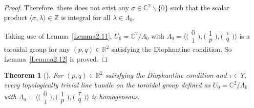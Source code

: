 \documentclass[10pt,a4paper]{amsart}
\numberwithin{equation}{section}
\newtheorem{Theorem}{Theorem}[section]
\begin{document}
\begin{proof}
Therefore, there does not exist any $\sigma \in \mathbb{C}^2 \backslash \{ 0 \}$ such that the scalar product $\langle \sigma,\lambda \rangle \in \mathbb{Z}$ is integral for all $ \lambda \in \Lambda_0 $.

Taking use of Lemma~\ref{Lemma2.11}, $U_0=\mathbb{C}^2/\Lambda_0$ with $\Lambda_0=\bigl\langle\bigl(\begin{smallmatrix}0 \\1\end{smallmatrix}\bigr),\bigl(\begin{smallmatrix}1 \\p\end{smallmatrix}\bigr),\bigl(\begin{smallmatrix}\tau \\q\end{smallmatrix}\bigr)\bigr\rangle$ is a toroidal group for any $(p,q) \in \mathbb{R}^2$ satisfying the Diophantine condition. So Lemma~\ref{Lemma2.12} is proved.
\end{proof}


\begin{Theorem}[{\cite[Proposition~2.4]{Takayuki-Takato2}}] \label{Theorem2.13}
 For $(p,q) \in \mathbb{R}^2$ satisfying the Diophantine condition and $\tau \in Y$, every topologically trivial line bundle on the toroidal group defined as $U_0=\mathbb{C}^2/\Lambda_0$ with $\Lambda_0=\bigl\langle\bigl(\begin{smallmatrix}0 \\1\end{smallmatrix}\bigr),\bigl(\begin{smallmatrix}1 \\p\end{smallmatrix}\bigr),\bigl(\begin{smallmatrix}\tau \\q\end{smallmatrix}\bigr)\bigr\rangle$ is homogeneous.
\end{Theorem}
\end{document}
